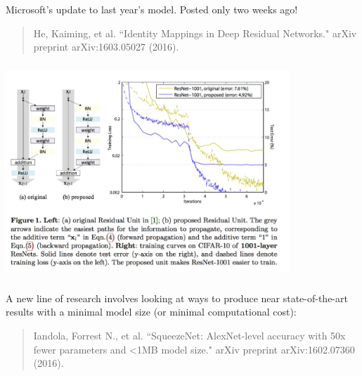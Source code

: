 \documentclass[xetex,mathserif,serif,aspectratio=169]{beamer}
\begin{document}
\begin{frame}[fragile] \frametitle{} \oldB \small


Microsoft's update to last year's model. Posted only two
weeks ago!
\begin{quote}
He, Kaiming, et al. ``Identity Mappings in Deep Residual Networks." arXiv preprint arXiv:1603.05027 (2016).
\end{quote}

\end{frame}

\begin{frame}[fragile] \frametitle{} \oldB \small

\begin{center}
\includegraphics[width=0.8\textwidth]{img/resNet1001.jpg}
\end{center}

\end{frame}

\begin{frame}[fragile] \frametitle{} \oldB \small


A new line of research involves looking at ways to produce near
state-of-the-art results with a minimal model size (or minimal
computational cost):
\begin{quote}
Iandola, Forrest N., et al. ``SqueezeNet: AlexNet-level accuracy with
50x fewer parameters and <1MB model size." arXiv preprint arXiv:1602.07360 (2016).
\end{quote}

\end{frame}
\end{document}
